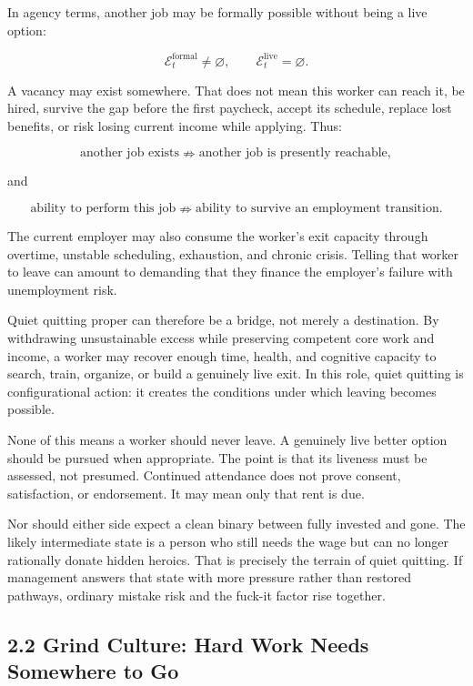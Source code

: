 \documentclass[11pt,oneside]{article}
\begin{document}
In agency terms, another job may be formally possible without being a
live option:

\[
\mathcal E_t^{\mathrm{formal}}\neq\varnothing,
\qquad
\mathcal E_t^{\mathrm{live}}=\varnothing.
\]

A vacancy may exist somewhere. That does not mean this worker can reach
it, be hired, survive the gap before the first paycheck, accept its
schedule, replace lost benefits, or risk losing current income while
applying. Thus:

\[
\text{another job exists}
\nRightarrow
\text{another job is presently reachable},
\]

and

\[
\text{ability to perform this job}
\nRightarrow
\text{ability to survive an employment transition}.
\]

The current employer may also consume the worker's exit capacity through
overtime, unstable scheduling, exhaustion, and chronic crisis. Telling
that worker to leave can amount to demanding that they finance the
employer's failure with unemployment risk.

Quiet quitting proper can therefore be a bridge, not merely a
destination. By withdrawing unsustainable excess while preserving
competent core work and income, a worker may recover enough time, health,
and cognitive capacity to search, train, organize, or build a genuinely
live exit. In this role, quiet quitting is configurational action: it
creates the conditions under which leaving becomes possible.

None of this means a worker should never leave. A genuinely live better
option should be pursued when appropriate. The point is that its
liveness must be assessed, not presumed. Continued attendance does not
prove consent, satisfaction, or endorsement. It may mean only that rent
is due.

Nor should either side expect a clean binary between fully invested and
gone. The likely intermediate state is a person who still needs the wage
but can no longer rationally donate hidden heroics. That is precisely the
terrain of quiet quitting. If management answers that state with more
pressure rather than restored pathways, ordinary mistake risk and the
fuck-it factor rise together.


\subsection{2.2 Grind Culture: Hard Work Needs Somewhere to
Go}\label{grind-culture-hard-work-needs-somewhere-to-go}
\end{document}
